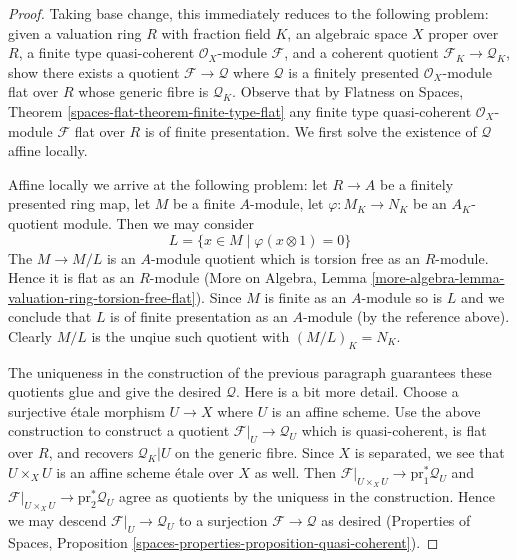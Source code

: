 \begin{proof}
Taking base change, this immediately reduces to the following
problem: given a valuation ring $R$ with fraction field $K$,
an algebraic space $X$ proper over $R$, a finite type quasi-coherent
$\mathcal{O}_X$-module $\mathcal{F}$, and a coherent
quotient $\mathcal{F}_K \to \mathcal{Q}_K$, show there exists
a quotient $\mathcal{F} \to \mathcal{Q}$ where $\mathcal{Q}$ is a
finitely presented $\mathcal{O}_X$-module
flat over $R$ whose generic fibre is $\mathcal{Q}_K$.
Observe that by Flatness on Spaces, Theorem
\ref{spaces-flat-theorem-finite-type-flat}
any finite type quasi-coherent $\mathcal{O}_X$-module
$\mathcal{F}$ flat over $R$ is of finite presentation.
We first solve the existence of $\mathcal{Q}$ affine locally.

\medskip\noindent
Affine locally we arrive at the following problem:
let $R \to A$ be a finitely presented ring map,
let $M$ be a finite $A$-module, let $\varphi : M_K \to N_K$ be
an $A_K$-quotient module. Then we may consider
$$
L = \{x \in M \mid \varphi(x \otimes 1) = 0 \}
$$
The $M \to M/L$ is an $A$-module quotient which is
torsion free as an $R$-module. Hence it is flat as an
$R$-module (More on Algebra, Lemma
\ref{more-algebra-lemma-valuation-ring-torsion-free-flat}).
Since $M$ is finite as an $A$-module so is $L$ and we
conclude that $L$ is of finite presentation as an $A$-module
(by the reference above). Clearly $M/L$ is the unqiue such
quotient with $(M/L)_K = N_K$.

\medskip\noindent
The uniqueness in the construction of the previous paragraph
guarantees these quotients glue and give the desired $\mathcal{Q}$.
Here is a bit more detail. Choose a surjective \'etale morphism
$U \to X$ where $U$ is an affine scheme. Use the above construction
to construct a quotient $\mathcal{F}|_U \to \mathcal{Q}_U$
which is quasi-coherent, is flat over $R$, and recovers $\mathcal{Q}_K|U$
on the generic fibre. Since $X$ is separated, we see that
$U \times_X U$ is an affine scheme \'etale over $X$ as well.
Then $\mathcal{F}|_{U \times_X U} \to \text{pr}_1^*\mathcal{Q}_U$ and
$\mathcal{F}|_{U \times_X U} \to \text{pr}_2^*\mathcal{Q}_U$
agree as quotients by the uniquess in the construction. Hence we may descend
$\mathcal{F}|_U \to \mathcal{Q}_U$ to a surjection
$\mathcal{F} \to \mathcal{Q}$ as desired (Properties of Spaces,
Proposition \ref{spaces-properties-proposition-quasi-coherent}).
\end{proof}



